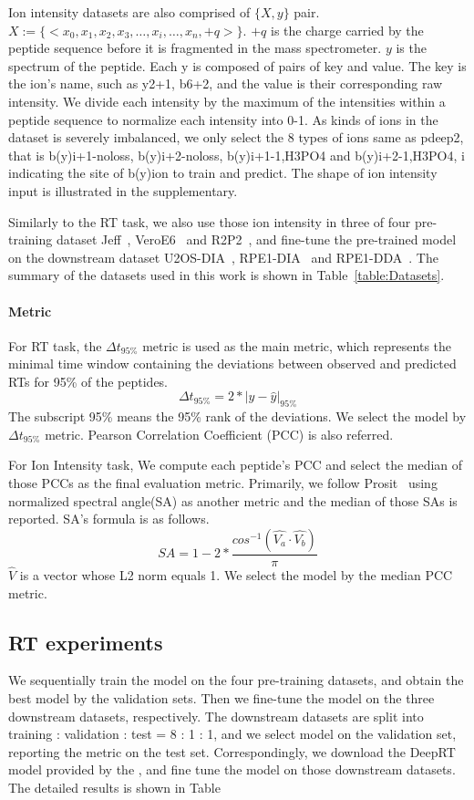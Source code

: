 Ion intensity datasets are also comprised of \( \{X, y\} \) pair. 
$X := \{ <x_0, x_1, x_2, x_3,\dots, x_i, \dots, x_n, +q> \}$. $+q$
is the charge carried by the peptide sequence before it is fragmented in the mass spectrometer. \( y \) is the spectrum of the peptide. Each y is composed of pairs of key and value.
The key is the ion's name, such as y2+1, b6+2, and the value is their corresponding raw intensity.
We divide each intensity by the maximum of the intensities within a peptide sequence to normalize each intensity into 0-1. As kinds of ions in the dataset is severely imbalanced, we only select the 8 types of ions same as pdeep2, that is b(y)i+1-noloss, b(y)i+2-noloss, b(y)i+1-1,H3PO4 and b(y)i+2-1,H3PO4, i indicating the site of b(y)ion to train and predict. The shape of ion intensity input is illustrated in the supplementary.

Similarly to the RT task, we also use those ion intensity in three of four pre-training dataset Jeff~\cite{liu2018vivo}, VeroE6~\cite{bouhaddou2020global} and R2P2~\cite{leutert2019r2}, and fine-tune the pre-trained model on the downstream dataset U2OS-DIA~\cite{wang2020naguider}, RPE1-DIA~\cite{bekker2020rapid} and RPE1-DDA~\cite{bekker2020rapid}. The summary of the datasets used in this work is shown in Table~\ref{table:Datasets}.
\paragraph*{Metric} For RT task, the $\Delta$$t_{95\%}$ metric is used as the main metric, which represents the minimal time window containing the deviations between observed and predicted RTs for 95\% of the peptides.
\[ \Delta t_{95\%} = 2 * | y - \hat{y} |_{95\%} \]
The subscript 95\% means the 95\% rank of the deviations.
We select the model by $\Delta$$t_{95\%}$ metric.
Pearson Correlation Coefficient (PCC) is also referred.

For Ion Intensity task, We compute each peptide's PCC and select the median of those PCCs as the final evaluation metric.
Primarily, we follow Prosit~\cite{gessulat2019prosit} using normalized
spectral angle(SA) as another metric and the median of those SAs is reported.
SA's formula is as follows.
\[ SA = 1 - 2 * \frac{cos^{-1}(\hat{V_a}\cdot\hat{V_b})}{\pi} \]
$\hat{V}$ is a vector whose L2 norm equals 1. We select the model by the median PCC metric.

\subsection{RT experiments}
We sequentially train the model on the four pre-training datasets, and obtain the best model by the validation sets. Then we fine-tune the model on the three downstream datasets, respectively. 
The downstream datasets are split into training : validation : test = 8 : 1 : 1, and we select model on the validation set, reporting the metric on the test set.  
Correspondingly, we download the DeepRT model provided by the \cite{ma2018improved}, and fine tune the model on those downstream datasets. The detailed results is shown in Table 

